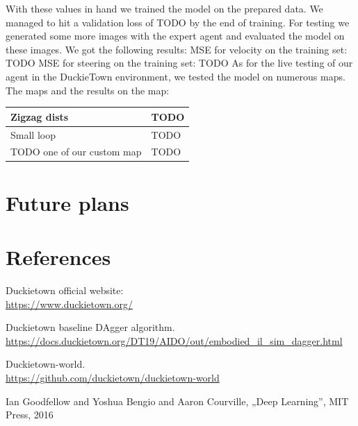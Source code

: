 \documentclass{article}
\begin{document}
With these values in hand we trained the model on the prepared data. We managed to hit a
validation loss of TODO by the end of training.
For testing we generated some more images with the expert agent and evaluated the model on these
images. We got the following results:
	MSE for velocity on the training set: TODO
	MSE for steering on the training set: TODO
As for the live testing of our agent in the DuckieTown environment, we tested the model on
numerous maps. The maps and the results on the map:

\begin{center}
\begin{tabular}{ | m{15em} | m{3em}| }
  \hline
    Zigzag dists & TODO \\
  \hline
    Small loop & TODO \\
      \hline
    TODO one of our custom map  & TODO \\
    \hline
\end{tabular}
\end{center}

\vspace*{2\baselineskip}


\section*{Future plans}
\pagebreak


\section*{References}
\vspace*{1\baselineskip}

Duckietown official website:
\\
\url{https://www.duckietown.org/}
\vspace*{1\baselineskip}

Duckietown baseline DAgger algorithm.
\\
\url{https://docs.duckietown.org/DT19/AIDO/out/embodied_il_sim_dagger.html}
\vspace*{1\baselineskip}

Duckietown-world.
\\
\url{https://github.com/duckietown/duckietown-world}

\vspace*{1\baselineskip}

Ian Goodfellow and Yoshua Bengio and Aaron Courville, „Deep Learning”, MIT Press, 2016
\end{document}
